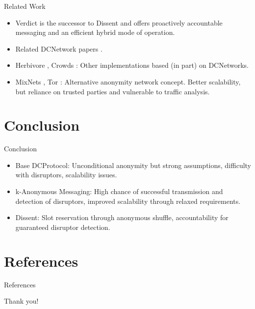 \documentclass[]{beamer} %
\begin{document}
\begin{frame}{Related Work}
\begin{itemize}
\item Verdict \cite{corrigan2013proactively} is the successor to Dissent and offers
      proactively accountable messaging and an efficient hybrid mode of operation.
\item Related \ac{DCNetwork} papers \cite{waidner1989dining,juels2004dining,bos1990detection}.
\item Herbivore \cite{goel2003herbivore}, Crowds \cite{reiter1998crowds}:
      Other implementations based (in part) on \acp{DCNetwork}.
\item \acp{MixNet} \cite{journals/cacm/Chaum81}, Tor \cite{conf/uss/DingledineMS04}:
      Alternative anonymity network concept. Better scalability,
      but reliance on trusted parties and vulnerable to traffic analysis.
\end{itemize}

\end{frame}

\section{Conclusion}

\begin{frame}{Conclusion}

\begin{itemize}
\item Base \ac{DCProtocol}: Unconditional anonymity but strong assumptions,
      difficulty with disruptors, scalability issues.
\item k-Anonymous Messaging: High chance of successful transmission and
      detection of disruptors, improved scalability through relaxed requirements.
\item Dissent: Slot reservation through anonymous shuffle, accountability for
      guaranteed disruptor detection.
\end{itemize}

\end{frame}

\section{References}

\begin{frame}[allowframebreaks]{References}
\printbibliography
\end{frame}

\begin{titleframe}
\begin{center}
\alert{\Large Thank you!}
\end{center}
\end{titleframe}
\end{document}
